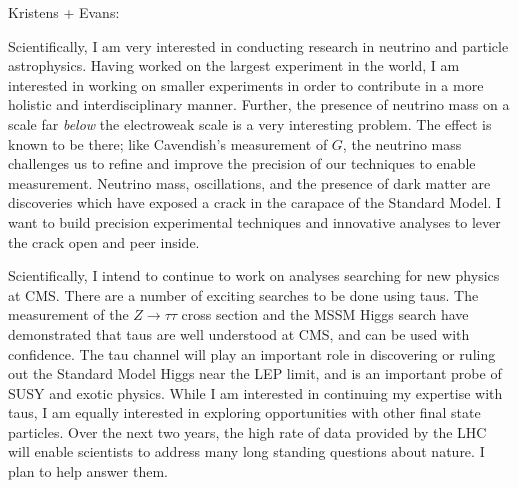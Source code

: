 \documentclass{scrartcl}        %
\begin{document}
\begin{cv}{}
Kristens + Evans: 

Scientifically, I am very interested in conducting research in neutrino and
particle astrophysics. Having worked on the largest experiment in the world, I
am interested in working on smaller experiments in order to contribute in a more
holistic and interdisciplinary manner. Further, the presence of neutrino mass on
a scale far \emph{below} the electroweak scale is a very interesting problem.
The effect is known to be there; like Cavendish's measurement of $G$, the
neutrino mass challenges us to refine and improve the precision of our
techniques to enable measurement. Neutrino mass, oscillations, and the presence
of dark matter are discoveries which have exposed a crack in the carapace of
the Standard Model.  I want to build precision experimental techniques and
innovative analyses to lever the crack open and peer inside.



Scientifically, I intend to continue to work on analyses searching for new
physics at CMS\@.  There are a number of exciting searches to be done 
using taus.  The measurement of the $Z\to\tau\tau$ cross section and the MSSM
Higgs search have demonstrated that taus are well understood at CMS, and can
be used with confidence.  The tau channel will play an important role in
discovering or ruling out the Standard Model Higgs near the LEP limit, and is an
important probe of SUSY and exotic physics. While I am interested in continuing
my expertise with taus, I am equally interested in exploring opportunities with
other final state particles.  Over the next two years, the high rate of data
provided by the LHC will enable scientists to address many long standing
questions about nature. I plan to help answer them. 

\end{cv}
\end{document}
